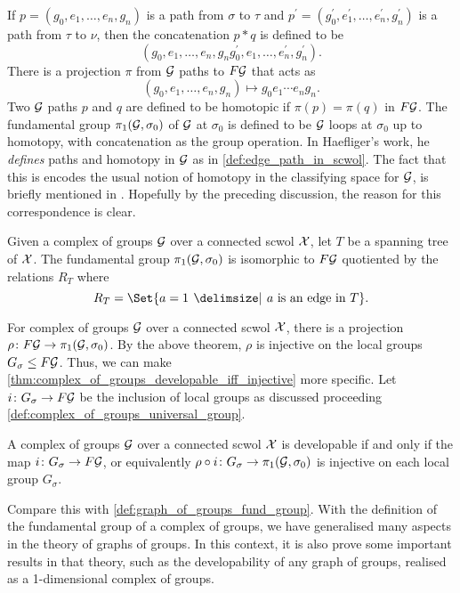 If $p = (g_0, e_1, \ldots, e_n, g_n)$ is a path from $\sigma$ to  $\tau$ and  $p^\prime = (g^\prime_0, e^\prime_1, \ldots, e^\prime_n, g^\prime_n)$ is a path from $\tau$ to $\nu$, then the concatenation  $p \ast q$ is defined to be
\[
	(g_0, e_1, \ldots, e_n, g_ng^\prime_0, e_1, \ldots, e^\prime_n, g^\prime_n)
	.\]
There is a projection $\pi$ from $\mathcal{G}$ paths to $F\mathcal{G}$ that acts as
\[
	(g_0, e_1, \ldots, e_n, g_n) \mapsto g_0e_1\cdots e_ng_n
	.\]
Two $\mathcal{G}$ paths  $p$ and $q$ are defined to be homotopic if $\pi(p) = \pi(q)$ in $F\mathcal{G}$.
The fundamental group $\pi_1(\mathcal{G}, \sigma_0)$ of $\mathcal{G}$ at $\sigma_0$ is defined to be $\mathcal{G}$ loops at  $\sigma_0$ up to homotopy, with concatenation as the group operation.
In Haefliger's work, he \emph{defines} paths and homotopy in $\mathcal{G}$ as in \cref{def:edge_path_in_scwol}.
The fact that this is encodes the usual notion of homotopy in the classifying space for $\mathcal{G}$, is briefly mentioned in \cite[Section 3.1.a]{haefliger_complexes_1991}.
Hopefully by the preceding discussion, the reason for this correspondence is clear.
\begin{theorem}
	Given a complex of groups $\mathcal{G}$ over a connected scwol  $\mathcal{X}$, let $T$ be a spanning tree of  $\mathcal{X}$.
	The fundamental group  $\pi_1(\mathcal{G}, \sigma_0)$ is isomorphic to $F\mathcal{G}$ quotiented by the relations  $R_T$ where
	\[
		R_T = \Set{a = 1 \given a \text{ is an edge in } T}
		.\]
\end{theorem}
For complex of groups $\mathcal{G}$ over a connected scwol $\mathcal{X}$, there is a projection $\rho \colon F\mathcal{G} \to \pi_1(\mathcal{G},\sigma_0)$.
By the above theorem, $\rho$ is injective on the local groups $G_\sigma \leq F\mathcal{G}$.
Thus, we can make \cref{thm:complex_of_groups_developable_iff_injective} more specific.
Let $i \colon G_\sigma \to F\mathcal{G}$ be the inclusion of local groups as discussed proceeding \cref{def:complex_of_groups_universal_group}.
\begin{theorem}
	A complex of groups $\mathcal{G}$ over a connected scwol  $\mathcal{X}$ is developable if and only if the map $i \colon G_\sigma \to F\mathcal{G}$, or equivalently $\rho \circ i \colon G_\sigma \to \pi_1(\mathcal{G}, \sigma_0)$ is injective on each local group $G_\sigma$.
\end{theorem}
Compare this with \cref{def:graph_of_groups_fund_group}.
With the definition of the fundamental group of a complex of groups, we have generalised many aspects in the theory of graphs of groups.
In this context, it is also prove some important results in that theory, such as the developability of any graph of groups, realised as a 1-dimensional complex of groups.

